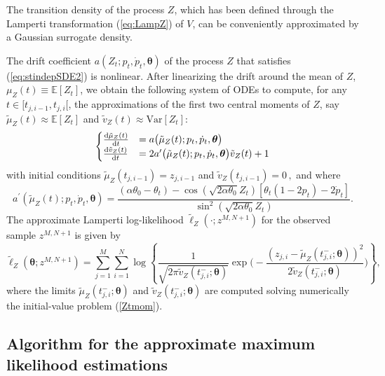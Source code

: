 \documentclass[11pt]{article}
\theoremstyle{definition}
\begin{document}
The transition density of the process $Z$, which has been defined through the Lamperti transformation (\ref{eq:LampZ}) of $V$, can be conveniently approximated by a Gaussian surrogate density. 

The drift coefficient $a(Z_t; p_t, \dot{p}_t, \bm{\theta}) $ of the process $Z$ that satisfies (\ref{eq:stindepSDE2}) is nonlinear. After linearizing the drift around the mean of $Z$, $\mu_Z(t) \equiv \mathbb{E}\left[Z_t\right]$,  we obtain the following system of ODEs to compute, for any $t\in [t_{j,i-1}, t_{j, i}[$, the approximations of the first two central moments of $Z$, say  $\tilde{\mu}_Z(t) \approx \mathbb{E}\left[Z_t\right]$ and $\tilde{v}_Z(t) \approx \text{Var} \left[Z_t\right]$:
\begin{equation}
\begin{cases}
\frac{\dif  \tilde{\mu}_Z (t)}{\dif t}&=  a\big( \tilde{\mu}_Z (t) ; p_t, \dot{p}_t, \bm{\theta} \big)   \\
\frac{\dif  \tilde{v}_Z (t)}{\dif t}&= 2  a^{\prime} \big( \tilde{\mu}_Z (t) ; p_t, \dot{p}_t, \bm{\theta} \big) \tilde{v}_Z (t) + 1
\end{cases}
\label{Ztmom}
\end{equation}
with initial conditions $\tilde{\mu}_Z(t_{j,i-1})= z_{j, i-1}$ and $\tilde{v}_Z(t_{j,i-1})= 0 \,,$ and where 
\begin{equation*}
a^{\prime} \left( \tilde{\mu}_Z (t) ; p_t, \dot{p}_t, \bm{\theta} \right) =    \frac{  (\alpha \theta_0 - \theta_t)  - \cos(\sqrt{2 \alpha \theta_0 } Z_t) [ \theta_t (1 - 2 p_t) - 2  \dot{p}_t ] }{\sin^2{(\sqrt{2 \alpha \theta_0} Z_t)}}.
\end{equation*}
The approximate Lamperti log-likelihood $\tilde{\ell}_Z\left(\cdot ; z^{M, N+1}\right)$ for the observed sample $z^{M, N+1}$ is given by
\begin{equation}
\tilde{\ell}_Z \left(\bm{\theta}; z^{M,N +1}\right) = \sum_{j=1}^M \sum_{i=1}^N \log \left\{ \frac{1}{\sqrt{2 \pi \tilde{v}_Z(t_{j,i}^-; \bm{\theta})}} \exp \Bigg( -\frac{(z_{j,i} - \tilde{\mu}_Z(t_{j,i}^-;\bm{\theta} ))^2}{2 \tilde{v}_Z(t_{j,i}^-; \bm{\theta})} \Bigg) \right\},
\label{loglikelihoodZ}
\end{equation}
where the limits $\tilde{\mu}_Z(t_{j,i}^-;\bm{\theta} )$ and $\tilde{v}_Z(t_{j,i}^-;\bm{\theta} )$ are computed solving numerically the initial-value problem (\ref{Ztmom}). 

\subsection{Algorithm for the approximate maximum likelihood estimations} \label{opt_sec}
\end{document}
